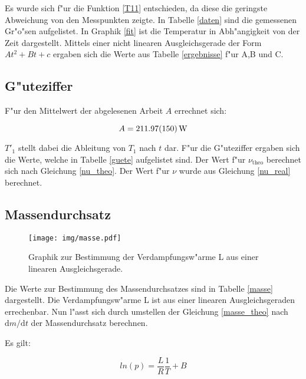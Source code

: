 Es wurde sich f"ur die Funktion \eqref{T11} entschieden, da diese die geringste Abweichung von den Messpunkten zeigte.
In Tabelle \ref{daten} sind die gemessenen Gr"o"sen aufgelistet. In Graphik \ref{fit} ist die Temperatur in Abh"angigkeit von der Zeit dargestellt.
Mittels einer nicht linearen Ausgleichsgerade der Form $A t^2 + B t +c$ ergaben sich die Werte aus Tabelle \ref{ergebnisse} f"ur A,B und C.



\subsection{G"uteziffer} %
\label{sub:g_uteziffer}



F"ur den Mittelwert der abgelesenen Arbeit $A$ errechnet sich:

\begin{equation}
	A = \SI{211.97 (150)}{\watt}
\end{equation}

$T'_\mathrm{1}$ stellt dabei die Ableitung von $T_\mathrm{1}$ nach $t$ dar.
F"ur die G"uteziffer ergaben sich die Werte, welche in Tabelle \ref{guete} aufgelistet sind.
Der Wert f"ur $\nu_\mathrm{theo}$ berechnet sich nach Gleichung \eqref{nu_theo}.
Der Wert f"ur $\nu$ wurde aus Gleichung \eqref{nu_real} berechnet.

\subsection{Massendurchsatz} %
\label{sub:massendurchsatz}

\begin{figure}[!h]
	\centering
	\texttt{[image: img/masse.pdf]}
	\caption{Graphik zur Bestimmung der Verdampfungsw"arme L aus einer linearen Ausgleichsgerade.}
	\label{L}
\end{figure}



Die Werte zur Bestimmung des Massendurchsatzes sind in Tabelle \ref{masse} dargestellt.
Die Verdampfungsw"arme L ist aus einer linearen Ausgleichsgeraden errechenbar. Nun l"asst sich durch umstellen der Gleichung \eqref{masse_theo} nach $\mathrm{d}m/\mathrm{d}t$ der Massendurchsatz berechnen.

Es gilt:

\begin{equation}
	ln(p) = \frac{L}{R}\frac{1}{T}+ B
\end{equation}

